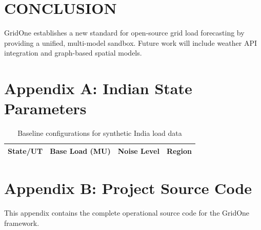 \documentclass[12pt,a4paper,twoside,fleqn]{report}
\begin{document}
\chapter{CONCLUSION}
GridOne establishes a new standard for open-source grid load forecasting by providing a unified, multi-model sandbox. Future work will include weather API integration and graph-based spatial models.
\chapter{Appendix A: Indian State Parameters}
\begin{table}[H]\centering\begin{tabularx}{\textwidth}{|X|c|c|c|}\hline \textbf{State/UT} & \textbf{Base Load (MU)} & \textbf{Noise Level} & \textbf{Region} \\ \hline
\end{tabularx}\caption{Baseline configurations for synthetic India load data}\end{table}
\chapter{Appendix B: Project Source Code}
This appendix contains the complete operational source code for the GridOne framework.
\end{document}
